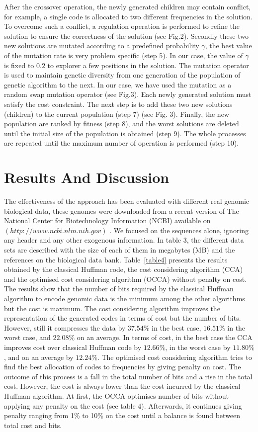 \documentclass[twocolumn,12pt,a4paper]{article}
\begin{document}
After the crossover operation, the newly generated children may contain conflict, for example, a single code is allocated to two different frequencies in the solution. To overcome such a conflict, a regulation operation is performed to refine the solution to ensure the correctness of the solution (see Fig.2).
 Secondly these two new solutions are mutated according to a predefined probability $\gamma$, the best value of the mutation rate is very problem specific (step 5). In our case, the value of $\gamma$ is fixed to $0.2$ to explorer a few positions in the solution. The mutation operator is used to maintain genetic diversity from one generation of the population of genetic algorithm to the next. In our case, we have used the mutation as a random swap mutation operator (see Fig.3).  Each newly generated solution must satisfy the cost constraint. The next step is to add these two new solutions (children) to the current population (step 7) (see Fig. 3). Finally, the new population are ranked by fitness (step 8), and the worst solutions are deleted until the initial size of the population is obtained  (step 9). The whole processes are repeated until the maximum number of operation is performed (step 10). 


\section{Results And Discussion}
\label{sec4}
The effectiveness of the approach has been evaluated with different real genomic biological data, these genomes were downloaded from a recent version of The National Center for Biotechnology Information (NCBI) available on $(http://www.ncbi.nlm.nih.gov)$ \citep{pruitt2009ncbi}. We focused on the sequences alone, ignoring any header and any other exogenous information. In table 3, the different data sets are described with the size  of each of them in megabytes (MB) and the references on the biological data bank.
Table~\ref{table4} presents the results obtained by the classical Huffman code, the cost considering algorithm (CCA) and the optimised cost considering algorithm (OCCA) without penalty on cost. The results show that the number of bits required by the classical Huffman algorithm to encode genomic data is the minimum among the other algorithms but the cost is  maximum. The cost considering algorithm improves the representation of the generated codes in terms of cost but the number of bits. However, still it compresses the data by $37.54\%$ in the best case, $16.51\%$ in the worst case, and $22.08\%$ on an average. In terms of cost, in the best case the CCA improves cost over classical Huffman code by $12.66\%$, in the worst case by $11.80\%$, and on an average by $12.24\%$.  The optimised cost considering algorithm tries to find the best allocation of codes to frequencies by giving penalty on cost. The outcome of this process is a fall in the total number of bits and a rise in the total cost. However, the cost is always lower than the cost incurred by the classical Huffman algorithm. At first, the OCCA optimises number of bits without applying any penalty on the cost (see table 4). Afterwards, it continues giving penalty ranging from 1\% to 10\% on the cost  until a balance is found between total cost and bits. 
\end{document}
